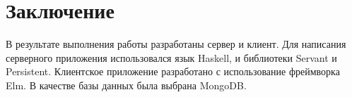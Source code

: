 \chapter{Заключение}
В результате выполнения работы разработаны сервер и клиент. Для написания серверного приложения использовался язык Haskell, и  библиотеки Servant и Persistent. Клиентское приложение разработано с использование фреймворка Elm. В качестве базы данных была выбрана MongoDB.